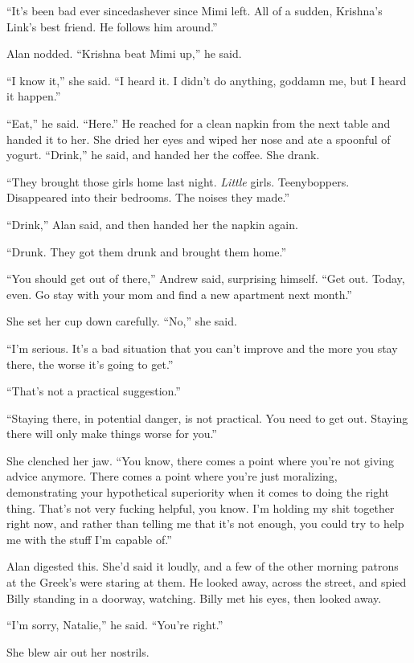 ``It's been bad ever sincedash{}ever since Mimi left.  All of a sudden,
Krishna's Link's best friend.  He follows him around.''

Alan nodded.  ``Krishna beat Mimi up,'' he said. 

``I know it,'' she said.  ``I heard it.  I didn't do anything, goddamn
me, but I heard it happen.''

``Eat,'' he said.  ``Here.'' He reached for a clean napkin from the
next table and handed it to her.  She dried her eyes and wiped her
nose and ate a spoonful of yogurt.  ``Drink,'' he said, and handed her
the coffee.  She drank.

``They brought those girls home last night.  \textit{Little} girls. 
Teenyboppers.  Disappeared into their bedrooms.  The noises they
made.''

``Drink,'' Alan said, and then handed her the napkin again.

``Drunk.  They got them drunk and brought them home.''

``You should get out of there,'' Andrew said, surprising himself. 
``Get out.  Today, even.  Go stay with your mom and find a new
apartment next month.''

She set her cup down carefully.  ``No,'' she said.

``I'm serious.  It's a bad situation that you can't improve and the
more you stay there, the worse it's going to get.''

``That's not a practical suggestion.''

``Staying there, in potential danger, is not practical.  You need to
get out.  Staying there will only make things worse for you.''

She clenched her jaw.  ``You know, there comes a point where you're
not giving advice anymore.  There comes a point where you're just
moralizing, demonstrating your hypothetical superiority when it comes
to doing the right thing.  That's not very fucking helpful, you know. 
I'm holding my shit together right now, and rather than telling me
that it's not enough, you could try to help me with the stuff I'm
capable of.''

Alan digested this.  She'd said it loudly, and a few of the other
morning patrons at the Greek's were staring at them.  He looked away,
across the street, and spied Billy standing in a doorway, watching. 
Billy met his eyes, then looked away.

``I'm sorry, Natalie,'' he said.  ``You're right.''

She blew air out her nostrils. 

